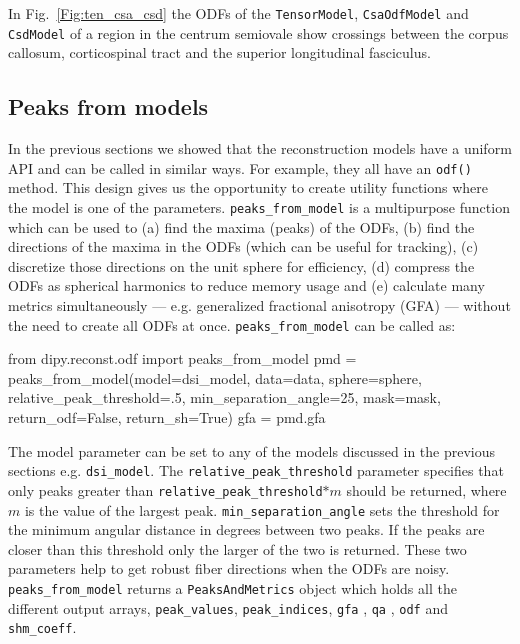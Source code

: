 \documentclass{bioinfo}
\begin{document}
In Fig.~\ref{Fig:ten_csa_csd} the ODFs of the \texttt{TensorModel},
\texttt{CsaOdfModel} and \texttt{CsdModel} of a region in the
centrum semiovale show crossings between the corpus callosum,
corticospinal tract and the superior longitudinal fasciculus.

\subsection{Peaks from models}
In the previous sections we showed that the reconstruction models have a
uniform API and can be called in similar ways. For example, they all have an
\texttt{odf()} method. This design gives us the opportunity to create utility functions
where the model is one of the parameters. \texttt{peaks\_from\_model} is a
multipurpose function which can be used to (a) find the maxima (peaks) of the
ODFs, (b) find the directions of the maxima in the ODFs (which can be useful for
tracking), (c) discretize those directions on the unit sphere for efficiency, (d)
compress the ODFs as spherical harmonics to reduce memory usage and (e)
calculate many metrics simultaneously --- e.g. generalized fractional anisotropy
(GFA) \citep{tuch:04} --- without the need to create all ODFs at
once. \texttt{peaks\_from\_model} can be called as:
\begin{python}
from dipy.reconst.odf import peaks_from_model
pmd = peaks_from_model(model=dsi_model,
                       data=data,
                       sphere=sphere,
                       relative_peak_threshold=.5,
                       min_separation_angle=25,
                       mask=mask,
                       return_odf=False,
                       return_sh=True)
gfa = pmd.gfa
\end{python}
The model parameter can be set to any of the models discussed in the previous sections
e.g. \texttt{dsi\_model}. The \texttt{relative\_peak\_threshold} parameter
specifies that only peaks greater than \texttt{relative\_peak\_threshold}$*m$
should be returned, where $m$ is the value of the largest
peak. \texttt{min\_separation\_angle} sets the threshold for the minimum
angular distance in degrees between two peaks. If the peaks are closer than
this threshold only the larger of the two is returned. These two parameters help
to get robust fiber directions when the ODFs are
noisy. \texttt{peaks\_from\_model} returns a \texttt{PeaksAndMetrics} object
which holds all the different output arrays, \texttt{peak\_values},
\texttt{peak\_indices}, \texttt{gfa} , \texttt{qa}
\citep{yeh-etal:10}, \texttt{odf} and \texttt{shm\_coeff}.
\end{document}
